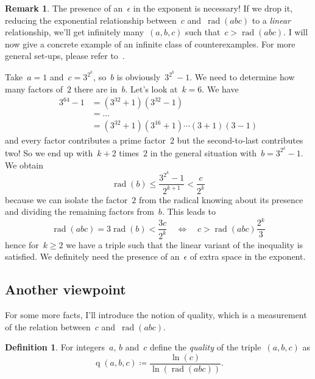 \documentclass[11pt, a4paper, openany, oneside, article]{memoir}
\theoremstyle{definition}
\newtheorem{definition}[theorem]{Definition}
\newtheorem{remark}[theorem]{Remark}
\DeclareMathOperator\rad{rad}
\DeclareMathOperator\quality{q}
\begin{document}
\begin{remark}
  The presence of an~$\epsilon$ in the exponent is necessary! If we drop it, reducing the exponential relationship between~$c$ and~$\rad(abc)$ to a \emph{linear} relationship, we'll get infinitely many~$(a,b,c)$ such that~$c>\rad(abc)$. I will now give a concrete example of an infinite class of counterexamples. For more general set-ups, please refer to~\cite{lower-bounds-abc-hits}.
  
  Take~$a=1$ and~$c=3^{2^k}$, so~$b$ is obviously~$3^{2^k}-1$. We need to determine how many factors of~$2$ there are in~$b$. Let's look at~$k=6$. We have
  \begin{equation}
    \begin{aligned}
      3^{64}-1&=(3^{32}+1)(3^{32}-1) \\
      &=\ldots \\
      &=(3^{32}+1)(3^{16}+1)\cdots(3+1)(3-1)
    \end{aligned}
  \end{equation}
  and every factor contributes a prime factor~$2$ but the second-to-last contributes two! So we end up with~$k+2$ times~$2$ in the general situation with~$b=3^{2^k}-1$. We obtain
  \begin{equation}
    \rad(b)\leq\frac{3^{2^k}-1}{2^{k+1}}<\frac{c}{2^{k}}
  \end{equation}
  because we can isolate the factor~$2$ from the radical knowing about its presence and dividing the remaining factors from~$b$. This leads to
  \begin{equation}
    \rad(abc)=3\rad(b)<\frac{3c}{2^k}\quad\Leftrightarrow\quad c>\rad(abc)\frac{2^k}{3}
  \end{equation}
  hence for~$k\geq 2$ we have a triple such that the linear variant of the inequality is satisfied. We definitely need the presence of an~$\epsilon$ of extra space in the exponent.
\end{remark}

\subsection{Another viewpoint}

For some more facts, I'll introduce the notion of quality, which is a measurement of the relation between~$c$ and~$\rad(abc)$.

\begin{definition}
  For integers~$a$, $b$ and~$c$ define the \emph{quality} of the triple~$(a,b,c)$ as
  \begin{equation}
    \quality(a,b,c)\coloneqq\frac{\ln(c)}{\ln\left( \rad(abc) \right)}.
  \end{equation}
\end{definition}
\end{document}
